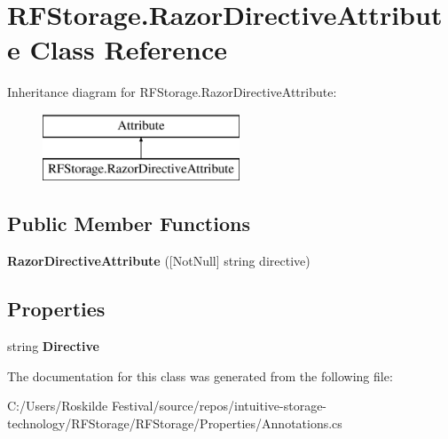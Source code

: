 \section{R\+F\+Storage.\+Razor\+Directive\+Attribute Class Reference}
\label{class_r_f_storage_1_1_razor_directive_attribute}
Inheritance diagram for R\+F\+Storage.\+Razor\+Directive\+Attribute\+:\begin{figure}[H]
\begin{center}
\leavevmode
\includegraphics[height=2.000000cm]{class_r_f_storage_1_1_razor_directive_attribute}
\end{center}
\end{figure}
\subsection*{Public Member Functions}
\begin{DoxyCompactItemize}
\item 
\mbox{\label{class_r_f_storage_1_1_razor_directive_attribute_af06d18c4514c3634f8cacabc45dd4595}} 
{\bfseries Razor\+Directive\+Attribute} ([Not\+Null] string directive)
\end{DoxyCompactItemize}
\subsection*{Properties}
\begin{DoxyCompactItemize}
\item 
\mbox{\label{class_r_f_storage_1_1_razor_directive_attribute_ae27add7a9fc769a50c4f913c0e80a96b}} 
string {\bfseries Directive}\hspace{0.3cm}{\ttfamily  [get]}
\end{DoxyCompactItemize}


The documentation for this class was generated from the following file\+:\begin{DoxyCompactItemize}
\item 
C\+:/\+Users/\+Roskilde Festival/source/repos/intuitive-\/storage-\/technology/\+R\+F\+Storage/\+R\+F\+Storage/\+Properties/Annotations.\+cs\end{DoxyCompactItemize}
